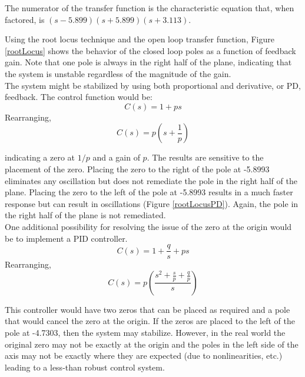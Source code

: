 \documentclass[12pt,letterpaper]{article}
\begin{document}
The numerator of the transfer function is the characteristic equation that, when factored, is
$(s-5.899) (s+5.899) (s+3.113)$.

Using the root locus technique and the open loop transfer function, Figure \ref{rootLocus} shows the
behavior of the closed loop poles as a function of feedback gain.  Note that one pole is always in the right
half of the plane, indicating that the system is unstable regardless of the magnitude of the gain. \\


The system might be stabilized by using both proportional and derivative, or PD, feedback.  The control function would be:
\begin{equation}
	C(s) = 1 + p s
\end{equation}
Rearranging,
\begin{equation}
	C(s) = p\left(s+\frac{1}{p}\right)\label{pd}
\end{equation}

indicating a zero at $1/p$ and a gain of $p$.
The results are sensitive to the placement of the zero.  Placing the zero to the right of the pole at -5.8993 
eliminates any oscillation but does not remediate the pole in the right half of the plane.  Placing the zero to the left of the pole at -5.8993 results in a much faster response but can result in oscillations (Figure \ref{rootLocusPD}).  Again, the pole in the right half of the plane is not remediated. \\


One additional possibility for resolving the issue of the zero at the origin would be to implement a PID controller.
\begin{equation}
	C(s) = 1 + \frac{q}{s} + p s
\end{equation}
Rearranging,
\begin{equation}
	C(s) = p\left(\frac{s^2+\frac{s}{p}+\frac{q}{p}}{s}\right)
\end{equation}

This controller would have two zeros that can be placed as required and a pole that would cancel
the zero at the origin.  If the zeros are placed to the left of the pole at -4.7303, then the system may stabilize.
However, in the real world the original zero may not be exactly at the origin and the poles in the left side of the axis may not be exactly where they are expected (due to nonlinearities, etc.) 
leading to a less-than robust control system. \\
\end{document}
